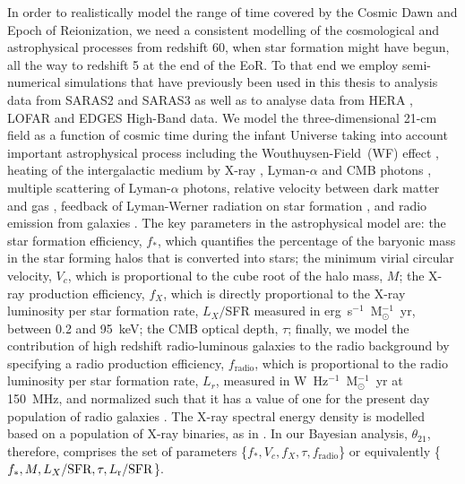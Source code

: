 In order to realistically model the range of time covered by the Cosmic Dawn and Epoch of Reionization, we need a consistent modelling of the cosmological and astrophysical processes from redshift 60, when star formation might have begun, all the way to redshift 5 at the end of the EoR. To that end we employ semi-numerical simulations \cite{Visbal_2012,Fialkov_lyw_2013, fialkov_observable_2014, Fialkov_rich_2014, Reis_sta_2021} that have previously been used in this thesis to analysis data from SARAS2 \cite{Bevins_SARAS2_2022} and SARAS3 \cite{Bevins_saras3_2022} as well as to analyse data from HERA \cite{HERA_2022b}, LOFAR \cite{Mondal_LOFAR_2020} and EDGES High-Band \cite{Monsalve_EDGES_HB_3_2019} data. We model the three-dimensional 21-cm field as a function of cosmic time during the infant Universe taking into account important astrophysical process including the Wouthuysen-Field~(WF) effect \cite{Wouthuysen1952, Field1959,  Fialkov_rich_2014}, heating of the intergalactic medium by X-ray \cite{fialkov_observable_2014}, Lyman-$\alpha$ \cite{Reis_sta_2021} and CMB photons \cite{Fialkov2019}, multiple scattering of Lyman-$\alpha$ photons, relative velocity between dark matter and gas \cite{Visbal_2012}, feedback of Lyman-Werner radiation on star formation \cite{Fialkov_lyw_2013}, and radio emission from galaxies \cite{Reis2020}. The key parameters in the astrophysical model are: the star formation efficiency, $f_*$, which quantifies the percentage of the baryonic mass in the star forming halos that is converted into stars;  the minimum virial circular velocity, $V_c$, which is proportional to the cube root of the halo mass, $M$; the X-ray production efficiency, $f_X$, which is directly proportional to the X-ray luminosity per star formation rate, $L_X/$SFR measured in erg~s$^{-1}$~M$_\odot^{-1}$~yr, between 0.2 and 95~keV;  the CMB optical depth, $\tau$; finally,  we model the  contribution of high redshift radio-luminous galaxies to the radio background by specifying a radio production efficiency, $f_\mathrm{radio}$, which is proportional to the radio luminosity per star formation rate, $L_r$, measured in W~Hz$^{-1}$~M$_\odot^{-1}$~yr at 150~MHz, and normalized such that it has a value of one for the present day population of radio galaxies \cite{Reis2020}. The X-ray spectral energy density is modelled based on a population of X-ray binaries, as in \cite{Fragos_Xrays_2013}. In our Bayesian analysis, $\theta_{21}$, therefore, comprises the set of parameters \{$f_*, V_c, f_X, \tau, f_\mathrm{radio}$\} or equivalently \{$f_*, M, L_X/\textnormal{SFR}, \tau, L_\mathrm{r}/\textnormal{SFR}$\}.

